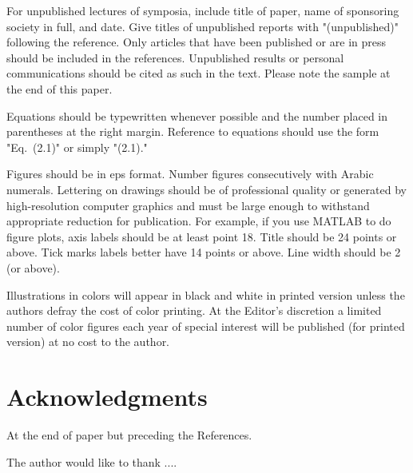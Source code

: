 \documentclass[mathpazo]{csiam-am}
\begin{document}
For unpublished lectures of symposia, include title of paper, name of
sponsoring society in full, and date. Give titles of unpublished reports
with "(unpublished)" following the reference. Only articles that have been
published or are in press should be included in the references.
Unpublished results or personal communications should be cited as such in
the text. Please note the sample at the end of this paper.

Equations should be typewritten whenever possible and the number placed in parentheses at the right margin.
Reference to equations should use the form "Eq.~(2.1)" or simply "(2.1)."

Figures should be in eps format. Number figures consecutively with Arabic numerals.
Lettering on drawings should be of professional quality or generated by high-resolution computer graphics and must be
large enough to withstand appropriate reduction for publication.
For example, if you use {\sf MATLAB} to do figure plots,
axis labels should be at least point 18. Title should be 24 points or above. Tick marks labels
better have 14 points or above. Line width should be 2 (or above).

Illustrations in colors will appear in black and white in printed version unless the authors defray the cost of color printing.
At the Editor's discretion a limited number of color figures each year of special interest
will be published (for printed version) at no cost to the author.

\section*{Acknowledgments}

At the end of paper but preceding the References.

The author would like to thank  ....
\end{document}
